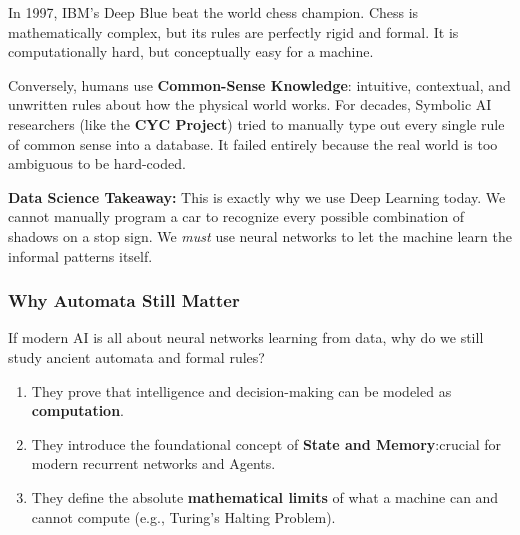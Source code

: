 \documentclass[11pt]{article}
\theoremstyle{smallexample}
\begin{document}
In 1997, IBM's Deep Blue beat the world chess champion. Chess is mathematically complex, but its rules are perfectly rigid and formal. It is computationally hard, but conceptually easy for a machine. 

Conversely, humans use \textbf{Common-Sense Knowledge}: intuitive, contextual, and unwritten rules about how the physical world works. For decades, Symbolic AI researchers (like the \textbf{CYC Project}) tried to manually type out every single rule of common sense into a database. It failed entirely because the real world is too ambiguous to be hard-coded. 

\textbf{Data Science Takeaway:} This is exactly why we use Deep Learning today. We cannot manually program a car to recognize every possible combination of shadows on a stop sign. We \textit{must} use neural networks to let the machine learn the informal patterns itself.

\subsubsection{Why Automata Still Matter}
If modern AI is all about neural networks learning from data, why do we still study ancient automata and formal rules?
\begin{enumerate}
    \item They prove that intelligence and decision-making can be modeled as \textbf{computation}.
    \item They introduce the foundational concept of \textbf{State and Memory}:crucial for modern recurrent networks and Agents.
    \item They define the absolute \textbf{mathematical limits} of what a machine can and cannot compute (e.g., Turing's Halting Problem).
\end{enumerate}



\pagebreak



  
\end{document}

